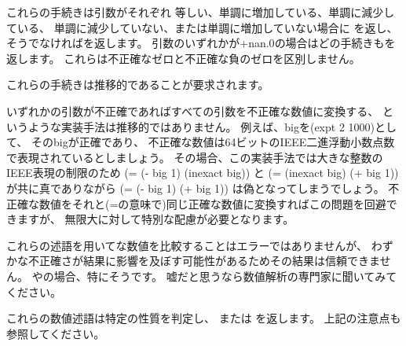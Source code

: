 \begin{entry}{%
}

これらの手続きは引数がそれぞれ
等しい、単調に増加している、単調に減少している、
単調に減少していない、または単調に増加していない場合に
\schtrue{}を返し、そうでなければ\schfalse{}を返します。
引数のいずれかが{\cf +nan.0}の場合はどの手続きも\schfalse{}を返します。
これらは不正確なゼロと不正確な負のゼロを区別しません。

これらの手続きは推移的であることが要求されます。

\begin{note}
いずれかの引数が不正確であればすべての引数を不正確な数値に変換する、
というような実装手法は推移的ではありません。
例えば、{\cf big}を{\cf (expt 2 1000)}として、
その{\cf big}が正確であり、
不正確な数値は64ビットのIEEE二進浮動小数点数で表現されているとしましょう。
その場合、この実装手法では大きな整数のIEEE表現の制限のため
{\cf (= (- big 1) (inexact big))} と {\cf (= (inexact big) (+ big 1))} が共に真でありながら
{\cf (= (- big 1) (+ big 1))} は偽となってしまうでしょう。
不正確な数値をそれと({\cf =}の意味で)同じ正確な数値に変換すればこの問題を回避できますが、
無限大に対して特別な配慮が必要となります。
\end{note}

\begin{note}
これらの述語を用いてな数値を比較することはエラーではありませんが、
わずかな不正確さが結果に影響を及ぼす可能性があるためその結果は信頼できません。
\ide{=}やの場合、特にそうです。
嘘だと思うなら数値解析の専門家に聞いてみてください。

\end{note}

\end{entry}

\begin{entry}{%
}

これらの数値述語は特定の性質を判定し、\schtrue{} または \schfalse を返します。
上記の注意点も参照してください。

\end{entry}

